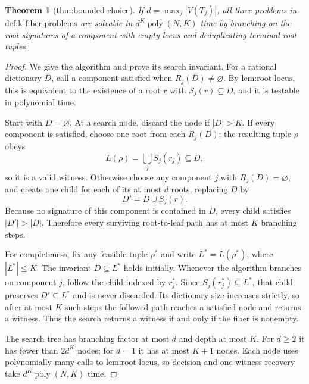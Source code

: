 \documentclass{article}
\newtheorem{theorem}{Theorem}
\begin{document}
\begin{theorem}[thm:bounded-choice]\label{thm:bounded-choice}
If \(d=\max_j|V(T_j)|\), all three problems in \(\text{def:k-fiber-problems}\) are solvable in \(d^K\operatorname{poly}(N,K)\) time by branching on the root signatures of a component with empty locus and deduplicating terminal root tuples.
\end{theorem}
\begin{proof}
We give the algorithm and prove its search invariant.  For a rational dictionary \(D\), call a component satisfied when \(R_j(D)\ne\varnothing\).  By \(\text{lem:root-locus}\), this is equivalent to the existence of a root \(r\) with \(S_j(r)\subseteq D\), and it is testable in polynomial time.

Start with \(D=\varnothing\).  At a search node, discard the node if \(|D|>K\).  If every component is satisfied, choose one root from each \(R_j(D)\); the resulting tuple \(\rho\) obeys
\[
 L(\rho)=\bigcup_jS_j(r_j)\subseteq D,
\]
so it is a valid witness.  Otherwise choose any component \(j\) with \(R_j(D)=\varnothing\), and create one child for each of its at most \(d\) roots, replacing \(D\) by
\[
 D'=D\cup S_j(r).
\]
Because no signature of this component is contained in \(D\), every child satisfies \(|D'|>|D|\).  Therefore every surviving root-to-leaf path has at most \(K\) branching steps.

For completeness, fix any feasible tuple \(\rho^*\) and write \(L^*=L(\rho^*)\), where \(|L^*|\le K\).  The invariant \(D\subseteq L^*\) holds initially.  Whenever the algorithm branches on component \(j\), follow the child indexed by \(r_j^*\).  Since \(S_j(r_j^*)\subseteq L^*\), that child preserves \(D'\subseteq L^*\) and is never discarded.  Its dictionary size increases strictly, so after at most \(K\) such steps the followed path reaches a satisfied node and returns a witness.  Thus the search returns a witness if and only if the fiber is nonempty.

The search tree has branching factor at most \(d\) and depth at most \(K\).  For \(d\ge2\) it has fewer than \(2d^K\) nodes; for \(d=1\) it has at most \(K+1\) nodes.  Each node uses polynomially many calls to \(\text{lem:root-locus}\), so decision and one-witness recovery take \(d^K\operatorname{poly}(N,K)\) time.


\end{proof}
\end{document}
